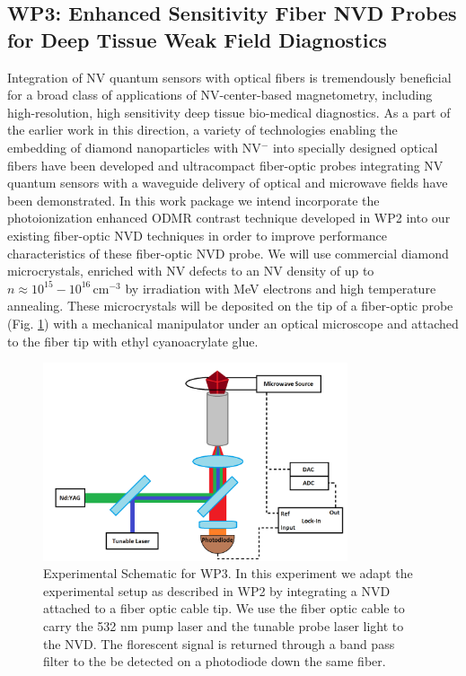 \documentclass[11pt]{article}
\newcommand{\unit}[1]{\ensuremath{\, \mathrm{#1}}}
\begin{document}
\subsection{WP3: Enhanced Sensitivity Fiber NVD Probes for Deep Tissue Weak Field Diagnostics}
Integration of NV quantum sensors with optical fibers is tremendously beneficial for a broad class of
applications of NV-center-based magnetometry, including high-resolution, high sensitivity deep tissue
bio-medical diagnostics. As a part of the earlier work in this direction, a variety of technologies
enabling the embedding of diamond nanoparticles with NV$^-$ into specially designed optical fibers
have been developed and ultracompact fiber-optic probes integrating NV quantum sensors with a waveguide
delivery of optical and microwave fields have been demonstrated. In this work package we intend
incorporate the photoionization enhanced ODMR contrast technique developed in WP2 into our existing
fiber-optic NVD techniques in order to improve performance characteristics of these fiber-optic NVD
probe. We will use commercial diamond microcrystals, enriched with NV defects to an NV density of up to
$n \approx 10^{15}-10^{16}\unit{cm^{-3}}$ by irradiation with MeV electrons and high temperature annealing. 
These microcrystals will be deposited on the tip of a fiber-optic probe (Fig. \ref{WP3Schematic}) with a mechanical 
manipulator under an optical microscope and attached to the fiber tip with ethyl cyanoacrylate glue.

\begin{figure}[h]
\centering
\includegraphics[width=0.8\textwidth]{Figures/DualFiberWP3Image.png}
\caption{Experimental Schematic for WP3. In this experiment we adapt the experimental setup as described in WP2 by integrating a NVD attached to a fiber optic cable tip. We use the fiber optic cable to carry the 532 nm pump laser and the tunable probe laser light to the NVD. The florescent signal is returned through a band pass filter to the be detected on a photodiode down the same fiber.}
\label{WP3Schematic}
\end{figure}
\end{document}
